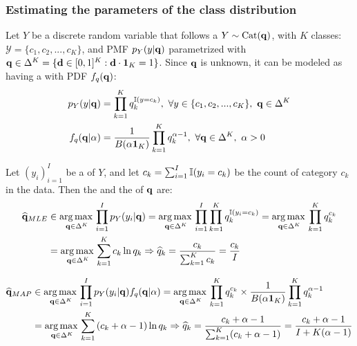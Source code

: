 \subsubsection{Estimating the parameters of the class distribution}



Let $Y$ be a discrete random variable that follows a 
 $Y\sim\textrm{Cat}(\vb{q})$, with $K$ classes: $\mathcal{Y} =\{c_1,c_2,...,c_K\}$, and PMF $p_Y(y|\vb{q})$ parametrized with $\vb{q}\in \Delta^K = \{\vb{d}\in[0,1]^K: \vb{d}\cdot\vb{1}_K=1 \}$. Since $\vb{q}$ is unknown, it can be modeled as having a   with PDF $f_q(\vb{q})$: 
\begin{align*}
    p_Y(y|\vb{q}) & =\prod_{k=1}^Kq_{k}^{\operatorname{\mathbb{I}}(y=c_k)}, \ \forall y\in\{c_1,c_2,...,c_K\},\ \vb{q}\in \Delta^K \\
    f_q(\vb{q}|\alpha) &= \frac{1}{B(\alpha\vb{1}_K)}\prod_{k=1}^Kq_{k}^{\alpha-1},\ \forall \vb{q}\in \Delta^K,\ \alpha>0
\end{align*}

Let $(y_i)_{i=1}^I$ be a  of $Y$, and let $c_k=\sum_{i=1}^I\operatorname{\mathbb{I}}(y_i=c_k)$ be the count of category $c_k$ in the data. Then the  and the  of $\vb{q}$ are:
\begin{align*}
    \widehat{\vb{q}}_{MLE} &\in\operatorname*{arg\,max\,}\limits_{\vb{q}\in\Delta^K}\prod_{i=1}^I p_Y(y_i|\vb{q})
    =\operatorname*{arg\,max\,}\limits_{\vb{q}\in\Delta^K}\prod_{i=1}^I \prod_{k=1}^Kq_{k}^{\operatorname{\mathbb{I}}(y_i=c_k)}
    =\operatorname*{arg\,max\,}\limits_{\vb{q}\in\Delta^K} \prod_{k=1}^Kq_{k}^{c_k} \\
    &=\operatorname*{arg\,max\,}\limits_{\vb{q}\in\Delta^K}\sum_{k=1}^Kc_k\ln q_{k} \Rightarrow \widehat{q}_k=\frac{c_k}{\sum_{k=1}^Kc_k}=\frac{c_k}{I}
\end{align*}

\begin{align*}
    \widehat{\vb{q}}_{MAP} &\in\operatorname*{arg\,max\,}\limits_{\vb{q}\in\Delta^K}\prod_{i=1}^I p_Y(y_i|\vb{q})f_q(\vb{q}|\alpha)
    =\operatorname*{arg\,max\,}\limits_{\vb{q}\in\Delta^K} \prod_{k=1}^Kq_{k}^{c_k}\times \frac{1}{B(\alpha\vb{1}_K)}\prod_{k=1}^Kq_{k}^{\alpha-1} \\
    &=\operatorname*{arg\,max\,}\limits_{\vb{q}\in\Delta^K}\sum_{k=1}^K\left(c_k+\alpha-1\right)\ln q_{k} \Rightarrow \widehat{q}_k=\frac{c_k+\alpha-1}{\sum_{k=1}^K(c_k+\alpha-1)}=\frac{c_k+\alpha-1}{I+K(\alpha-1)}
\end{align*}




